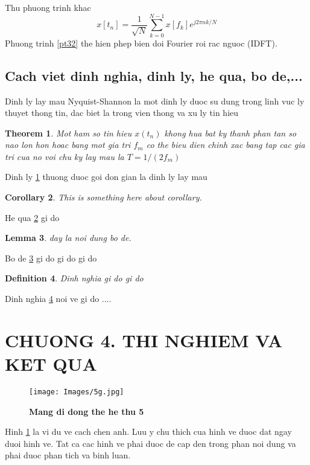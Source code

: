 \documentclass{article}
\newtheorem{theorem}{Theorem}[section]
\newtheorem{defn}[theorem]{Definition}
\newtheorem{corollary}[theorem]{Corollary}
\newtheorem{lemma}[theorem]{Lemma}
\begin{document}
Thu phuong trinh khac
\begin{equation} \label{pt32}
    x[t_n] = \frac{1}{\sqrt{N}} \sum_{k=0}^{N-1}x[f_k]e^{j 2\pi n k/N}
\end{equation}
Phuong trinh \ref{pt32} the hien phep bien doi Fourier roi rac nguoc (IDFT).

\subsection{Cach viet dinh nghia, dinh ly, he qua, bo de,...}
Dinh ly lay mau Nyquist-Shannon la mot dinh ly duoc su dung trong linh vuc ly thuyet thong tin, dac biet la trong vien thong va xu ly tin hieu
\begin{theorem} \label{dlNq}
Mot ham so tin hieu $x(t_n)$ khong hua bat ky thanh phan tan so nao lon hon hoac bang mot gia tri $f_m$ co the bieu dien chinh xac bang tap cac gia tri cua no voi chu ky lay mau la $T=1/(2f_m) $     
\end{theorem}
Dinh ly \ref{dlNq} thuong duoc goi don gian la dinh ly lay mau

\begin{corollary} \label{coro1}
This is something here about corollary.
\end{corollary}
He qua \ref{coro1} gi do

\begin{lemma} \label{lemma1}
day la noi dung bo de.
\end{lemma}
Bo de \ref{lemma1} gi do gi do gi do

\begin{defn} \label{defn1}
Dinh nghia gi do gi do
\end{defn}
Dinh nghia \ref{defn1} noi ve gi do ....
\newpage

\section*{CHUONG 4. THI NGHIEM VA KET QUA}
\setcounter{section}{4}
\setcounter{subsection}{0}
\setcounter{figure}{0}
\setcounter{table}{0}
\lipsum
\begin{figure}[H]
    \centering
    \texttt{[image: Images/5g.jpg]}
    \caption[Mang 5g]{\bfseries \fontsize{12pt}{0pt}\selectfont Mang di dong the he thu 5}
    \label{hinh41}
\end{figure}
Hinh \ref{hinh41} la vi du ve cach chen anh. Luu y chu thich cua hinh ve duoc dat ngay duoi hinh ve. Tat ca cac hinh ve phai duoc de cap den trong phan noi dung va phai duoc phan tich va binh luan.
\clearpage
\end{document}
